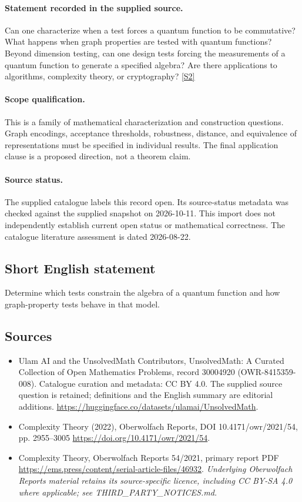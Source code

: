 \documentclass[11pt]{article}
\begin{document}
\paragraph{Statement recorded in the supplied source.}
Can one characterize when a test forces a quantum function to be commutative? What happens when graph properties are tested with quantum functions? Beyond dimension testing, can one design tests forcing the measurements of a quantum function to generate a specified algebra? Are there applications to algorithms, complexity theory, or cryptography? \href{https://doi.org/10.4171/owr/2021/54}{[S2]}
\paragraph{Scope qualification.}
This is a family of mathematical characterization and construction questions. Graph encodings, acceptance thresholds, robustness, distance, and equivalence of representations must be specified in individual results. The final application clause is a proposed direction, not a theorem claim.
\paragraph{Source status.}
The supplied catalogue labels this record open. Its source-status metadata was checked against the supplied snapshot on 2026-10-11. This import does not independently establish current open status or mathematical correctness. The catalogue literature assessment is dated 2026-08-22.
\subsection{Short English statement}
Determine which tests constrain the algebra of a quantum function and how graph-property tests behave in that model.
\subsection{Sources}
\begin{itemize}
\item[S1] Ulam AI and the UnsolvedMath Contributors, UnsolvedMath: A Curated Collection of Open Mathematics Problems, record 30004920 (OWR-8415359-008). Catalogue curation and metadata: CC BY 4.0. The supplied source question is retained; definitions and the English summary are editorial additions.
\url{https://huggingface.co/datasets/ulamai/UnsolvedMath}.
\item[S2] Complexity Theory (2022), Oberwolfach Reports, DOI 10.4171/owr/2021/54, pp. 2955--3005
\url{https://doi.org/10.4171/owr/2021/54}.
\item[S3] Complexity Theory, Oberwolfach Reports 54/2021, primary report PDF
\url{https://ems.press/content/serial-article-files/46932}.
\textit{Underlying Oberwolfach Reports material retains its source-specific licence, including CC BY-SA 4.0 where applicable; see THIRD\_PARTY\_NOTICES.md.}
\end{itemize}
\end{document}
